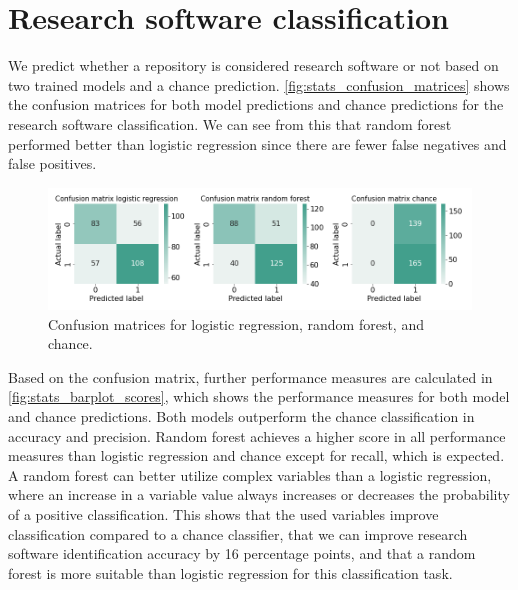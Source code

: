 \newpage
\section{Research software classification}
\label{sec:classification}
We predict whether a repository is considered research software or not based on two trained models and a chance prediction.
\autoref{fig:stats_confusion_matrices} shows the confusion matrices for both model predictions and chance predictions for the research software classification. We can see from this that random forest performed better than logistic regression since there are fewer false negatives and false positives. 

\begin{figure}[h!]
\centerline{
\includegraphics[scale=0.5]{figures_results/stats_confusion_matrices.png}}
\caption{Confusion matrices for logistic regression, random forest, and chance.
\label{fig:stats_confusion_matrices}}
\end{figure}



Based on the confusion matrix, further performance measures are calculated in \autoref{fig:stats_barplot_scores}, which shows the performance measures for both model and chance predictions. Both models outperform the chance classification in accuracy and precision. Random forest achieves a higher score in all performance measures than logistic regression and chance except for recall, which is expected. A random forest can better utilize complex variables than a logistic regression, where an increase in a variable value always increases or decreases the probability of a positive classification. This shows that the used variables improve classification compared to a chance classifier, that we can improve research software identification accuracy by 16 percentage points, and that a random forest is more suitable than logistic regression for this classification task.

